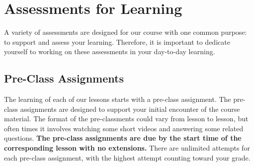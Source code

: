 \documentclass[12pt]{article}
\begin{document}

        \section{Assessments for Learning}

        A variety of assessments are designed for our course with one common purpose: to support and assess your learning. Therefore, it is important to dedicate yourself to working on these assessments in your day-to-day learning. 
        
        \subsection{Pre-Class Assignments}
        
        The learning of each of our lessons starts with a pre-class assignment. The pre-class assignments are designed to support your initial encounter of the course material. The format of the pre-classments could vary from lesson to lesson, but often times it involves watching some short videos and answering some related questions. \textbf{The pre-class assignments are due by the start time of the corresponding lesson with no extensions.} There are unlimited attempts for each pre-class assignment, with the highest attempt counting toward your grade.
        
\end{document}
